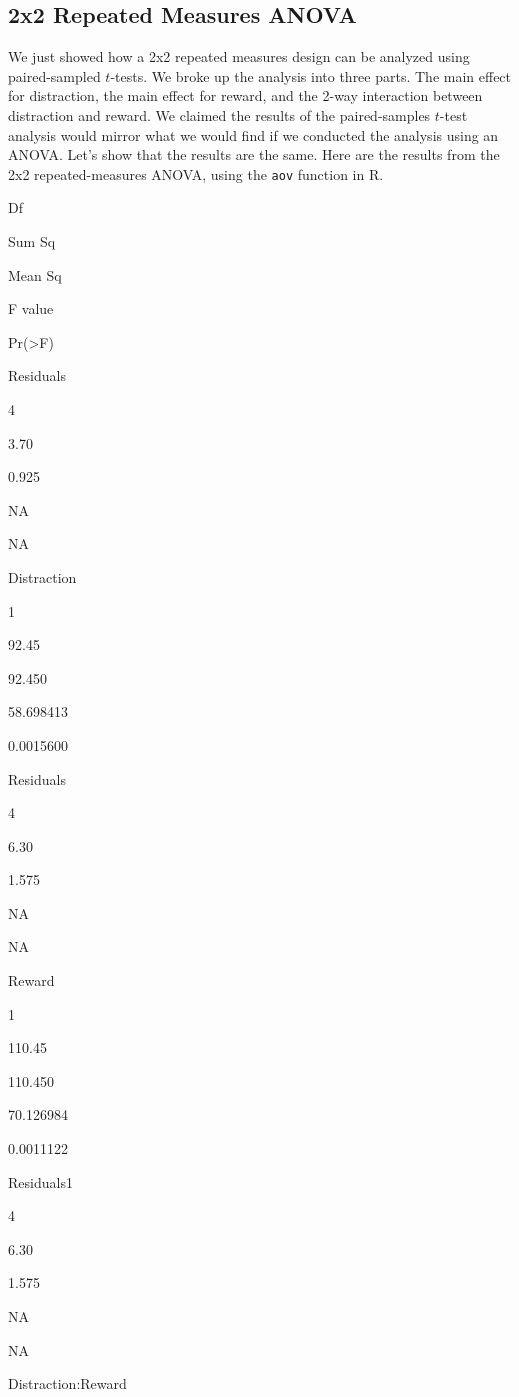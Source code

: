 \documentclass[]{book}
\begin{document}
\hypertarget{x2-repeated-measures-anova}{%
\subsection{2x2 Repeated Measures ANOVA}\label{x2-repeated-measures-anova}}

We just showed how a 2x2 repeated measures design can be analyzed using paired-sampled \(t\)-tests. We broke up the analysis into three parts. The main effect for distraction, the main effect for reward, and the 2-way interaction between distraction and reward. We claimed the results of the paired-samples \(t\)-test analysis would mirror what we would find if we conducted the analysis using an ANOVA. Let's show that the results are the same. Here are the results from the 2x2 repeated-measures ANOVA, using the \texttt{aov} function in R.

Df

Sum Sq

Mean Sq

F value

Pr(\textgreater{}F)

Residuals

4

3.70

0.925

NA

NA

Distraction

1

92.45

92.450

58.698413

0.0015600

Residuals

4

6.30

1.575

NA

NA

Reward

1

110.45

110.450

70.126984

0.0011122

Residuals1

4

6.30

1.575

NA

NA

Distraction:Reward
\end{document}
